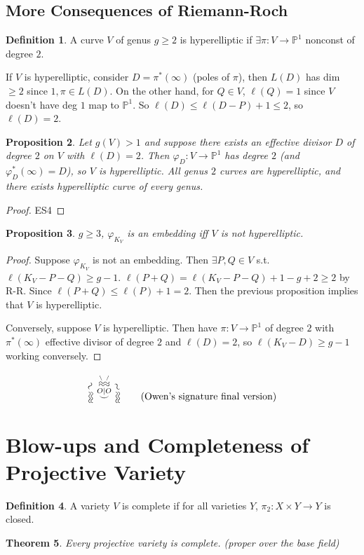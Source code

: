 \documentclass{article}
\theoremstyle{definition}
\newtheorem{defn}{Definition}[section]
\theoremstyle{remark}
\theoremstyle{plain}
\newtheorem{thm}[defn]{Theorem}
\newtheorem{prop}[defn]{Proposition}
\newcommand{\PP}{\mathbb{P}}
\begin{document}
\subsection{More Consequences of Riemann-Roch}
\begin{defn}
    A curve $V$ of genus $g\ge 2$ is hyperelliptic if $\exists\pi:V\to\PP^1$ nonconst of degree $2$.
\end{defn}
If $V$ is hyperelliptic, consider $D=\pi^\ast(\infty)$ (poles of $\pi$), then $L(D)$ has dim $\ge 2$ since $1,\pi\in L(D)$. On the other hand, for $Q\in V$, $\ell(Q)=1$ since $V$ doesn't have deg $1$ map to $\PP^1$. So $\ell(D)\le \ell(D-P)+1\le 2$, so $\ell(D)=2$.
\begin{prop}
    Let $g(V)>1$ and suppose there exists an effective divisor $D$ of degree $2$ on $V$ with $\ell(D)=2$. Then $\varphi_D:V\to\PP^1$ has degree $2$ (and $\varphi_D^\ast(\infty)=D$), so $V$ is hyperelliptic. All genus $2$ curves are hyperelliptic, and there exists hyperelliptic curve of every genus.
\end{prop}
\begin{proof}
    ES4
\end{proof}
\begin{prop}
    $g\ge 3$, $\varphi_{K_V}$ is an embedding iff $V$ is not hyperelliptic.
\end{prop}
\begin{proof}
    Suppose $\varphi_{K_V}$ is not an embedding. Then $\exists P,Q\in V$ s.t. $\ell(K_V-P-Q)\ge g-1$. $\ell(P+Q)=\ell(K_V-P-Q)+1-g+2\ge 2$ by R-R. Since $\ell(P+Q)\le \ell(P)+1=2$. Then the previous proposition implies that $V$ is hyperelliptic.

    Conversely, suppose $V$ is hyperelliptic. Then have $\pi:V\to\PP^1$ of degree $2$ with $\pi^\ast(\infty)$ effective divisor of degree $2$ and $\ell(D)=2$, so $\ell(K_V-D)\ge g-1$ working conversely.
\end{proof}

\[\overset{\rotatebox[origin=c]{60}{$\sim$}}{\rotatebox[origin=c]{90}{\aquarius}}\overset{\overset{\overset{\backslash\ /}{\aquarius}}{O\vert O}}{\smile}\overset{\rotatebox[origin=c]{120}{$\sim$}}{\rotatebox[origin=c]{90}{\aquarius}}\tag{Owen's signature final version}\]

\section{Blow-ups and Completeness of Projective Variety}
\begin{defn}
    A variety $V$ is complete if for all varieties $Y$, $\pi_2:X\times Y\to Y$ is closed.
\end{defn}
\begin{thm}
    Every projective variety is complete. (proper over the base field)
\end{thm}
\end{document}
